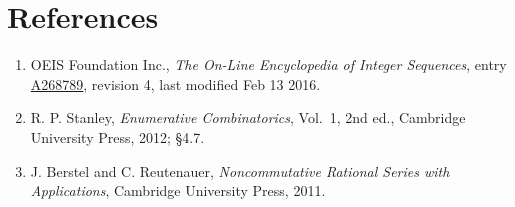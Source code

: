 \documentclass[11pt]{article}
\theoremstyle{definition}
\begin{document}
\section{References}

\begin{enumerate}

\item OEIS Foundation Inc., \emph{The On-Line Encyclopedia of Integer Sequences}, entry \href{https://oeis.org/A268789}{A268789}, revision 4, last modified Feb 13 2016.

\item R. P. Stanley, \emph{Enumerative Combinatorics}, Vol.~1, 2nd ed., Cambridge University Press, 2012; \S4.7.

\item J. Berstel and C. Reutenauer, \emph{Noncommutative Rational Series with Applications}, Cambridge University Press, 2011.

\end{enumerate}
\end{document}

